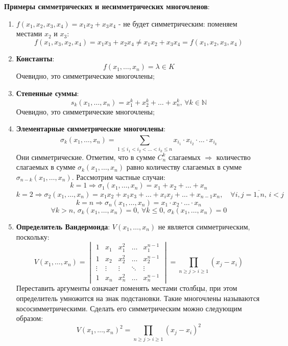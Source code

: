 \documentclass[12pt]{article}
\newcommand{\MN}{\mathbb{N}}
\theoremstyle{definition}
\newcommand{\ddsum}[2]{\displaystyle\sum\limits_{#1}^{#2}}
\newcommand{\ovl}[1]{\overline{#1}}
\begin{document}
\textbf{Примеры симметрических и несимметрических многочленов}:
\begin{enumerate}[label=\arabic*)]
	\item $f(x_1,x_2,x_3,x_4) = x_1x_2 + x_3x_4$ - не будет симметрическим: поменяем местами $x_2$ и $x_3$:
	$$
		f(x_1, x_3,x_2,x_4) = x_1x_3 + x_2 x_4 \neq x_1x_2 + x_3x_4 = f(x_1,x_2,x_3,x_4)
	$$ 
	\item \textbf{Константы}: 
	$$
		f(x_1,\dotsc,x_n) = \lambda \in K
	$$  
	Очевидно, это симметрические многочлены;
	\item \textbf{Степенные суммы}: 
	$$
		s_k(x_1,\dotsc,x_n) = x_1^k + x_2^k  + \dotsc + x_n^k,\, \forall k \in \MN
	$$ 
	Очевидно, это симметрические многочлены;
	\item \textbf{Элементарные симметрические многочлены}: 
	$$
		\sigma_k(x_1,\dotsc,x_n) = \ddsum{1\leq i_1 < i_2<\dotsc<i_k \leq n}{}x_{i_1}{\cdot}x_{i_2}{\cdot}\dotsc{\cdot}x_{i_k}
	$$
	Они симметрические. Отметим, что в сумме $C_n^k$ слагаемых $\Rightarrow$ количество слагаемых в сумме $\sigma_k(x_1,\dotsc,x_n)$ равно количеству слагаемых в сумме $\sigma_{n-k}(x_1,\dotsc,x_n)$. Рассмотрим частные случаи:
	$$
		k = 1 \Rightarrow \sigma_1(x_1,\dotsc,x_n) = x_1 + x_2 + \dotsc + x_n
	$$
	$$
		k = 2 \Rightarrow \sigma_2(x_1,\dotsc, x_n) = x_1x_2 + x_1x_3 + \dotsc + x_ix_j + \dotsc + x_{n-1}x_n, \quad \forall i,j = \ovl{1,n}, \, i < j
	$$
	$$
		k = n \Rightarrow \sigma_n(x_1,\dotsc,x_n) = x_1{\cdot}x_2{\cdot}\dotsc{\cdot}x_n
	$$
	$$
		\forall k > n, \, \sigma_k(x_1,\dotsc,x_n) = 0, \, \forall k \leq 0 , \, \sigma_k(x_1,\dotsc,x_n) = 0
	$$
	\item \textbf{Определитель Вандермонда}: $V(x_1,\dotsc,x_n)$ не является симметрическим, поскольку:
	$$
		V(x_1,\dotsc,x_n) = 
		\begin{vmatrix}
			1 & x_1 & x_1^2 & \dotsc & x_1^{n-1}\\
			1 & x_2 & x_2^2 & \dotsc & x_2^{n-1}\\
			\vdots & \vdots & \vdots & \ddots & \vdots \\
			1 & x_n & x_n^2 & \dotsc & x_n^{n-1}
		\end{vmatrix} = \prod\limits_{n\geq j > i \geq 1}(x_j - x_i)
	$$
	Переставить аргументы означает поменять местами столбцы, при этом определитель умножится на знак подстановки. Такие многочлены называются кососимметрическими. Сделать его симметрическим можно следующим образом:
	$$
		V(x_1,\dotsc,x_n)^2 = \prod\limits_{n\geq j > i \geq 1}(x_j - x_i)^2
	$$
\end{enumerate}
\end{document}
